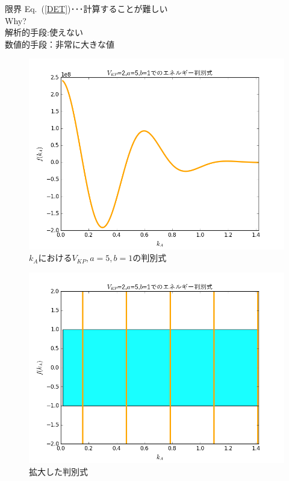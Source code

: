 \documentclass[unicode, 12pt, aspectratio=169]{beamer}
\newcommand{\eref}[1]{Eq.~(\ref{#1})}
\begin{document}
\begin{frame}
  \begin{block}{限界}
    \eref{DET}･･･計算することが難しい\\
    \alert{Why?}\\
    解析的手段:使えない\\
    数値的手段：非常に大きな値
    \begin{figure}[h]
             \centering
             \includegraphics[width=70truemm]{figure_2.png}
             \caption{$k_A$における$V_{KP},a=5,b=1$の判別式}
             \label{BZ1}
    \end{figure}
  \end{block}
\end{frame}

\begin{frame}
    \begin{figure}[h]
            \centering
            \includegraphics[width=70truemm]{figure_1.png}
            \caption{拡大した判別式}
            \label{BZ2}
    \end{figure}
\end{frame}
\end{document}
